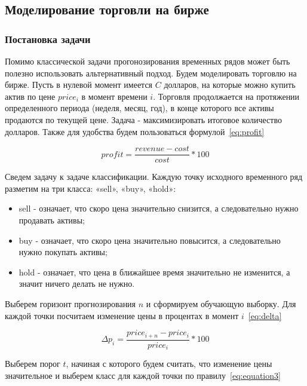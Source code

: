 \documentclass[a4paper,article,14pt]{extarticle}
\begin{document}
\subsection{Моделирование торговли на бирже}
\subsubsection{Постановка задачи}

Помимо классической задачи прогонозирования временных рядов может быть полезно использовать альтернативный подход.
Будем моделировать торговлю на бирже.
Пусть в нулевой момент имеется $C$ долларов, на которые можно купить актив по цене $price_i$ в момент времени $i$.
Торговля продолжается на протяжении определенного периода (неделя, месяц, год), в конце которого все активы продаются по текущей цене.
Задача - максимизировать итоговое количество долларов.
Также для удобства будем пользоваться формулой~\eqref{eq:profit}

\begin{equation}
    profit = \frac{revenue - cost}{cost} * 100
    \label{eq:profit}
\end{equation}

Сведем задачу к задаче классификации.
Каждую точку исходного временного ряд разметим на три класса: «sell», «buy», «hold»:

\begin{itemize}
    \item sell - означает, что скоро цена значительно снизится, а следовательно нужно продавать активы;
    \item buy - означает, что скоро цена значительно повысится, а следовательно нужно покупать активы;
    \item hold - означает, что цена в ближайшее время значительно не изменится, а значит ничего делать не нужно.
\end{itemize}

Выберем горизонт прогнозирования $n$ и сформируем обучающую выборку.
Для каждой точки посчитаем изменение цены в процентах в момент $i$~\eqref{eq:delta}

\begin{equation}
    \Delta p_i = \frac{price_{i + n} - price_{i}}{price_{i}} * 100
    \label{eq:delta}
\end{equation}

Выберем порог $t$, начиная с которого будем считать, что изменение цены значительное и выберем класс для каждой точки по правилу~\eqref{eq:equation3}
\end{document}
